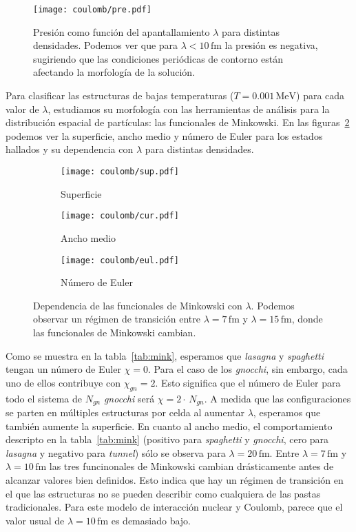 \begin{figure}[h!]  \centering
\centering
\texttt{[image: coulomb/pre.pdf]}
\caption{Presión como función del apantallamiento $\lambda$ para distintas densidades.
  Podemos ver que para $\lambda<10\,\text{fm}$ la presión es negativa, sugiriendo que las condiciones periódicas de contorno están afectando la morfología de la solución.}
\label{fig:pre}
\end{figure}

Para clasificar las estructuras de bajas temperaturas ($T=0.001\,\text{MeV}$) para cada valor de $\lambda$, estudiamos su morfología con las herramientas de análisis para la distribución espacial de partículas: las funcionales de Minkowski.
En las figuras~\ref{fig:minkowski} podemos ver la superficie, ancho medio y número de Euler para los estados hallados y su dependencia con $\lambda$ para distintas densidades.

\begin{figure}[h!]  %
\centering
\begin{subfigure}[h!]{0.4\columnwidth}
  \centering
  \texttt{[image: coulomb/sup.pdf]}
  \caption{Superficie}
\end{subfigure}
\begin{subfigure}[h!]{0.4\columnwidth}
  \centering
  \texttt{[image: coulomb/cur.pdf]}
  \caption{Ancho medio}
\end{subfigure}
\begin{subfigure}[h!]{0.4\columnwidth}
  \centering
  \texttt{[image: coulomb/eul.pdf]}
  \caption{Número de Euler}
\end{subfigure}
\caption{Dependencia de las funcionales de Minkowski con $\lambda$.
  Podemos observar un régimen de transición entre $\lambda=7\,\text{fm}$ y $\lambda=15\,\text{fm}$, donde las funcionales de Minkowski cambian.}
\label{fig:minkowski}
\end{figure}

Como se muestra en la tabla~\ref{tab:mink}, esperamos que \emph{lasagna} y \emph{spaghetti} tengan un número de Euler $\chi=0$.
Para el caso de los \emph{gnocchi}, sin embargo, cada uno de ellos contribuye con $\chi_{gn}=2$.
Esto significa que el número de Euler para todo el sistema de $N_{gn}$ \emph{gnocchi} será $\chi=2\cdot\,N_{gn}$.
A medida que las configuraciones se parten en múltiples estructuras por celda al aumentar $\lambda$, esperamos que también aumente la superficie.
En cuanto al ancho medio, el comportamiento descripto en la tabla~\ref{tab:mink} (positivo para \emph{spaghetti} y \emph{gnocchi}, cero para \emph{lasagna} y negativo para \emph{tunnel}) sólo se observa para $\lambda=20\,\text{fm}$.
Entre $\lambda=7\,\text{fm}$ y $\lambda=10\,\text{fm}$ las tres funcinonales de Minkowski cambian drásticamente antes de alcanzar valores bien definidos.
Esto indica que hay un régimen de transición en el que las estructuras no se pueden describir como cualquiera de las pastas tradicionales.
Para este modelo de interacción nuclear y Coulomb, parece que el valor usual de $\lambda=10\,\text{fm}$ es demasiado bajo.


